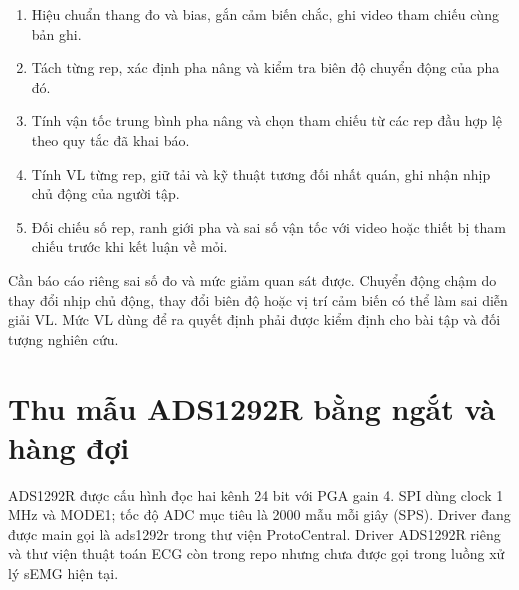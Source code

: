 \documentclass[12pt,letterpaper]{article}
\begin{document}
\begin{enumerate}

\item Hiệu chuẩn thang đo và bias, gắn cảm biến chắc, ghi video tham chiếu cùng bản ghi.

\item Tách từng rep, xác định pha nâng và kiểm tra biên độ chuyển động của pha đó.

\item Tính vận tốc trung bình pha nâng và chọn tham chiếu từ các rep đầu hợp lệ theo quy tắc đã khai báo.

\item Tính VL từng rep, giữ tải và kỹ thuật tương đối nhất quán, ghi nhận nhịp chủ động của người tập.

\item Đối chiếu số rep, ranh giới pha và sai số vận tốc với video hoặc thiết bị tham chiếu trước khi kết luận về mỏi.

\end{enumerate}

Cần báo cáo riêng sai số đo và mức giảm quan sát được. Chuyển động chậm do thay đổi nhịp chủ động, thay đổi biên độ hoặc vị trí cảm biến có thể làm sai diễn giải VL. Mức VL dùng để ra quyết định phải được kiểm định cho bài tập và đối tượng nghiên cứu.





\clearpage

\section{Thu mẫu ADS1292R bằng ngắt và hàng đợi}

ADS1292R được cấu hình đọc hai kênh 24 bit với PGA gain 4. SPI dùng clock 1 MHz và MODE1; tốc độ ADC mục tiêu là 2000 mẫu mỗi giây (SPS). Driver đang được main gọi là ads1292r trong thư viện ProtoCentral. Driver ADS1292R riêng và thư viện thuật toán ECG còn trong repo nhưng chưa được gọi trong luồng xử lý sEMG hiện tại.
\end{document}
